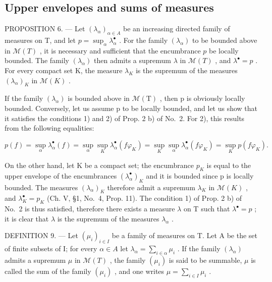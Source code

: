 \subsection{Upper envelopes and sums of measures}

PROPOSITION 6. --- Let \((\lambda_{\alpha})_{\alpha \in A}\) be an increasing directed family of measures on T, and let \(p = \sup_{\alpha} \lambda_{\alpha}^{\bullet}\) . For the family \((\lambda_{\alpha})\) to be bounded above in \(\mathcal{M}(T)\) , it is necessary and sufficient that the encumbrance \(p\) be locally bounded. The family \((\lambda_{\alpha})\) then admits a supremum \(\lambda\) in \(\mathcal{M}(T)\) , and \(\lambda^{\bullet} = p\) . For every compact set K, the measure \(\lambda_{K}\) is the supremum of the measures \((\lambda_{\alpha})_{K}\) in \(\mathcal{M}(K)\) .

If the family \((\lambda_{\alpha})\) is bounded above in \(\mathcal{M}(\mathrm{T})\) , then p is obviously locally bounded. Conversely, let us assume p to be locally bounded, and let us show that it satisfies the conditions 1) and 2) of Prop. 2 b) of No.~2. For 2), this results from the following equalities:

\[
p (f) = \sup _ {\alpha} \lambda_ {\alpha} ^ {\bullet} (f) = \sup _ {\alpha} \sup _ {K} \lambda_ {\alpha} ^ {\bullet} (f \varphi_ {K}) = \sup _ {K} \sup _ {\alpha} \lambda_ {\alpha} ^ {\bullet} (f \varphi_ {K}) = \sup _ {K} p (f \varphi_ {K}).
\]

On the other hand, let K be a compact set; the encumbrance \(p_{K}\) is equal to the upper envelope of the encumbrances \((\lambda_{\alpha}^{\bullet})_{K}\) and it is bounded since p is locally bounded. The measures \((\lambda_{\alpha})_{K}\) therefore admit a supremum \(\lambda_{K}\) in \(\mathcal{M}(K)\) , and \(\lambda_{K}^{\bullet}=p_{K}\) (Ch. V, §1, No.~4, Prop. 11). The condition 1) of Prop. 2 b) of No.~2 is thus satisfied, therefore there exists a measure \(\lambda\) on T such that \(\lambda^{\bullet}=p\) ; it is clear that \(\lambda\) is the supremum of the measures \(\lambda_{\alpha}\) .

DEFINITION 9. --- Let \((\mu_i)_{i \in I}\) be a family of measures on T. Let A be the set of finite subsets of I; for every \(\alpha \in A\) let \(\lambda_\alpha = \sum_{i \in \alpha} \mu_i\) . If the family \((\lambda_\alpha)\) admits a supremum \(\mu\) in \(\mathcal{M}(T)\) , the family \((\mu_i)\) is said to be summable, \(\mu\) is called the sum of the family \((\mu_i)\) , and one writes \(\mu = \sum_{i \in I} \mu_i\) .

